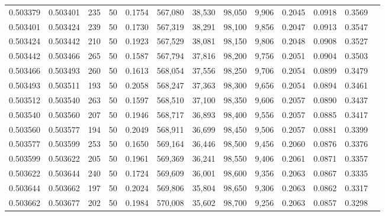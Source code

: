 \begin{tabular}{rrrrrrrrrrrrr}
0.503379 & 0.503401 & 235 &  50 &                                     0.1754 & 567,080 &  38,530 &  98,050 &   9,906 & 0.2045 & 0.0918 & 0.3569 \\
0.503401 & 0.503424 & 239 &  50 &                                     0.1730 & 567,319 &  38,291 &  98,100 &   9,856 & 0.2047 & 0.0913 & 0.3547 \\
0.503424 & 0.503442 & 210 &  50 &                                     0.1923 & 567,529 &  38,081 &  98,150 &   9,806 & 0.2048 & 0.0908 & 0.3527 \\
0.503442 & 0.503466 & 265 &  50 &                                     0.1587 & 567,794 &  37,816 &  98,200 &   9,756 & 0.2051 & 0.0904 & 0.3503 \\
0.503466 & 0.503493 & 260 &  50 &                                     0.1613 & 568,054 &  37,556 &  98,250 &   9,706 & 0.2054 & 0.0899 & 0.3479 \\
0.503493 & 0.503511 & 193 &  50 &                                     0.2058 & 568,247 &  37,363 &  98,300 &   9,656 & 0.2054 & 0.0894 & 0.3461 \\
0.503512 & 0.503540 & 263 &  50 &                                     0.1597 & 568,510 &  37,100 &  98,350 &   9,606 & 0.2057 & 0.0890 & 0.3437 \\
0.503540 & 0.503560 & 207 &  50 &                                     0.1946 & 568,717 &  36,893 &  98,400 &   9,556 & 0.2057 & 0.0885 & 0.3417 \\
0.503560 & 0.503577 & 194 &  50 &                                     0.2049 & 568,911 &  36,699 &  98,450 &   9,506 & 0.2057 & 0.0881 & 0.3399 \\
0.503577 & 0.503599 & 253 &  50 &                                     0.1650 & 569,164 &  36,446 &  98,500 &   9,456 & 0.2060 & 0.0876 & 0.3376 \\
0.503599 & 0.503622 & 205 &  50 &                                     0.1961 & 569,369 &  36,241 &  98,550 &   9,406 & 0.2061 & 0.0871 & 0.3357 \\
0.503622 & 0.503644 & 240 &  50 &                                     0.1724 & 569,609 &  36,001 &  98,600 &   9,356 & 0.2063 & 0.0867 & 0.3335 \\
0.503644 & 0.503662 & 197 &  50 &                                     0.2024 & 569,806 &  35,804 &  98,650 &   9,306 & 0.2063 & 0.0862 & 0.3317 \\
0.503662 & 0.503677 & 202 &  50 &                                     0.1984 & 570,008 &  35,602 &  98,700 &   9,256 & 0.2063 & 0.0857 & 0.3298 \\

\end{tabular}
